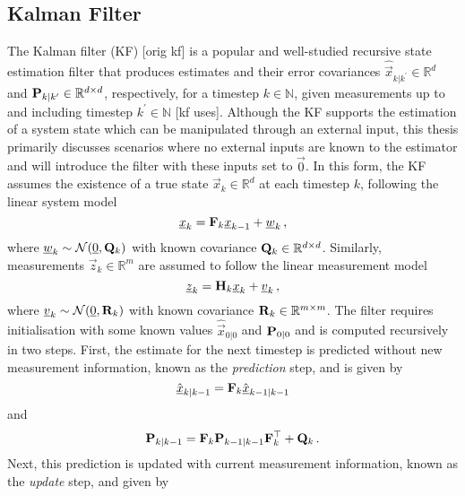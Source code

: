\subsection{Kalman Filter}\label{subsec:prelims:kf}
The Kalman filter (KF) [orig kf] is a popular and well-studied recursive state estimation filter that produces estimates and their error covariances $\hat{\vec{x}}_{k|k^\prime} \in \mathbb{R}^d$ and ${{\mathbf{P}}}_{k|k^\prime} \in \mathbb{R}^{d \times d}$, respectively, for a timestep $k \in \mathbb{N}$, given measurements up to and including timestep $k^\prime \in \mathbb{N}$ [kf uses]. Although the KF supports the estimation of a system state which can be manipulated through an external input, this thesis primarily discusses scenarios where no external inputs are known to the estimator and will introduce the filter with these inputs set to $\vec{0}$. In this form, the KF assumes the existence of a true state $\vec{x}_k \in \mathbb{R}^d$ at each timestep $k$, following the linear system model
\begin{equation}\label{eq:prelims:lin_gauss_system_model}
    {\underline{x}}_k = {{\mathbf{F}}}_k {\underline{x}}_{k-1} + {\underline{w}}_k\,,
\end{equation}
where ${\underline{w}}_k \sim \mathcal{N}({\underline{0}}, {{\mathbf{Q}}}_k)$ with known covariance ${{\mathbf{Q}}}_k \in \mathbb{R}^{d \times d}$. Similarly, measurements $\vec{z}_k \in \mathbb{R}^m$ are assumed to follow the linear measurement model
\begin{equation}\label{eq:prelims:lin_gauss_measurement_model}
    {\underline{z}}_k = {{\mathbf{H}}}_k {\underline{x}}_k + {\underline{v}}_k\,,
\end{equation}
where ${\underline{v}}_k \sim \mathcal{N}({\underline{0}}, {{\mathbf{R}}}_k)$ with known covariance ${{\mathbf{R}}}_k \in \mathbb{R}^{m \times m}$. The filter requires initialisation with some known values $\hat{\vec{x}}_{0|0}$ and ${{\mathbf{P}}}_{0|0}$ and is computed recursively in two steps. First, the estimate for the next timestep is predicted without new measurement information, known as the \textit{prediction} step, and is given by
\begin{equation}\label{eq:prelims:kf_est_predict}
    \hat{{\underline{x}}}_{k|k-1} = {{\mathbf{F}}}_k \hat{{\underline{x}}}_{k-1|k-1}
\end{equation}
and
\begin{equation}\label{eq:prelims:kf_cov_predict}
    {\ensuremath{{\mathbf{P}}}}_{k|k-1} = {{\mathbf{F}}}_k {{\mathbf{P}}}_{k-1|k-1} {{\mathbf{F}}}_k^\top + {{\mathbf{Q}}}_k\,.
\end{equation}
Next, this prediction is updated with current measurement information, known as the \textit{update} step, and given by
